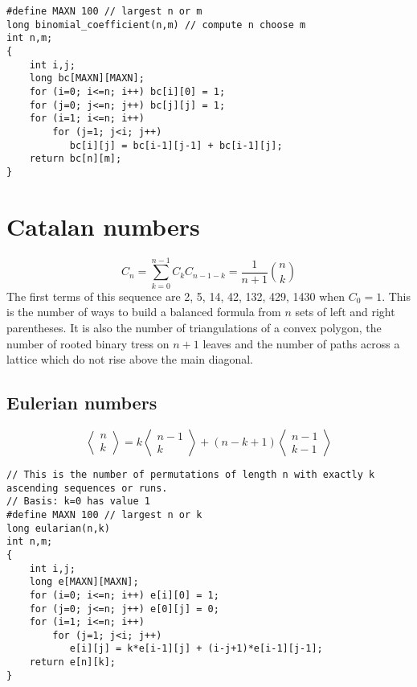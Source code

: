 \documentclass[a4paper]{article}
\begin{document}
\begin{verbatim}
#define MAXN 100 // largest n or m
long binomial_coefficient(n,m) // compute n choose m
int n,m;
{
    int i,j;
    long bc[MAXN][MAXN];
    for (i=0; i<=n; i++) bc[i][0] = 1;
    for (j=0; j<=n; j++) bc[j][j] = 1;
    for (i=1; i<=n; i++)
        for (j=1; j<i; j++)
           bc[i][j] = bc[i-1][j-1] + bc[i-1][j];
    return bc[n][m];
}
\end{verbatim}

\section{Catalan numbers}

\begin{equation}
	C_{n}=\sum_{k=0}^{n-1}C_{k}C_{n-1-k}=\frac{1}{n+1}{n\choose k}
\end{equation}
The first terms of this sequence are 2, 5, 14, 42, 132, 429, 1430 when $C_{0} = 1$. This is the number of ways to build a balanced formula from $n$ sets of left and right parentheses. It is also the number of triangulations of a convex polygon, the number of rooted binary tress on $n+1$ leaves and the number of paths across a lattice which do not rise above the main diagonal.

\subsection{Eulerian numbers}

\begin{equation}
\left\langle\begin{matrix}
n \\ k
\end{matrix}\right\rangle=k\left\langle\begin{matrix}
n-1 \\ k
\end{matrix}\right\rangle+(n-k+1)\left\langle\begin{matrix}
n-1 \\ k-1
\end{matrix}\right\rangle
\end{equation}

\begin{verbatim}
// This is the number of permutations of length n with exactly k ascending sequences or runs.
// Basis: k=0 has value 1
#define MAXN 100 // largest n or k
long eularian(n,k)
int n,m;
{
    int i,j;
    long e[MAXN][MAXN];
    for (i=0; i<=n; i++) e[i][0] = 1;
    for (j=0; j<=n; j++) e[0][j] = 0;
    for (i=1; i<=n; i++)
        for (j=1; j<i; j++)
           e[i][j] = k*e[i-1][j] + (i-j+1)*e[i-1][j-1];
    return e[n][k];
}
\end{verbatim}
\end{document}
